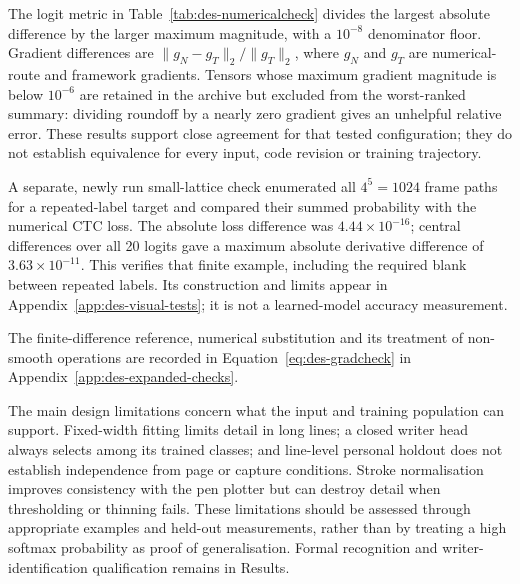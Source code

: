 The logit metric in Table~\ref{tab:des-numericalcheck} divides the largest absolute difference by the larger maximum magnitude, with a $10^{-8}$ denominator floor. Gradient differences are $\|g_N-g_T\|_2/\|g_T\|_2$, where $g_N$ and $g_T$ are numerical-route and framework gradients. Tensors whose maximum gradient magnitude is below $10^{-6}$ are retained in the archive but excluded from the worst-ranked summary: dividing roundoff by a nearly zero gradient gives an unhelpful relative error. These results support close agreement for that tested configuration; they do not establish equivalence for every input, code revision or training trajectory.


A separate, newly run small-lattice check enumerated all $4^5=1024$ frame paths for a repeated-label target and compared their summed probability with the numerical CTC loss. The absolute loss difference was $4.44\times10^{-16}$; central differences over all 20 logits gave a maximum absolute derivative difference of $3.63\times10^{-11}$. This verifies that finite example, including the required blank between repeated labels. Its construction and limits appear in Appendix~\ref{app:des-visual-tests}; it is not a learned-model accuracy measurement.

The finite-difference reference, numerical substitution and its treatment of non-smooth operations are recorded in Equation~\ref{eq:des-gradcheck} in Appendix~\ref{app:des-expanded-checks}.

The main design limitations concern what the input and training population can support. Fixed-width fitting limits detail in long lines; a closed writer head always selects among its trained classes; and line-level personal holdout does not establish independence from page or capture conditions. Stroke normalisation improves consistency with the pen plotter but can destroy detail when thresholding or thinning fails. These limitations should be assessed through appropriate examples and held-out measurements, rather than by treating a high softmax probability as proof of generalisation. Formal recognition and writer-identification qualification remains in Results.
\FloatBarrier
